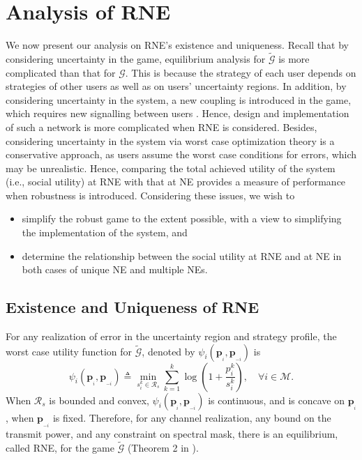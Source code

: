 \documentclass[peerreview,onecolumn,11pt,draftclsnofoot]{IEEEtran}\usepackage{amsmath}\usepackage{amsfonts}\usepackage{epsfig}\usepackage{amssymb}\usepackage{graphicx}\usepackage{amssymb,amsmath}\usepackage{cite}\usepackage{color,soul}\newcommand\T{\rule{0pt}{3.1ex}}
\begin{document}
\section{Analysis of RNE}
We now present our analysis on RNE's existence and uniqueness. Recall that by considering uncertainty in the game, equilibrium analysis for $\widetilde{\mathcal{G}}$ is more complicated than that for $\mathcal{G}$. This is because the strategy of each user depends on strategies of other users as well as on users' uncertainty regions. In addition, by considering uncertainty in the system, a new coupling is introduced in the game, which requires new signalling between users \cite{Robustnew}. Hence, design and implementation of such a network is more complicated when RNE is considered. Besides, considering uncertainty in the system via worst case optimization theory is a conservative approach, as users assume the worst case conditions for errors, which may be unrealistic. Hence, comparing the total achieved utility of the system (i.e., social utility) at RNE with that at NE provides a measure of performance when robustness is introduced. Considering these issues, we wish to
\begin{itemize}
  \item simplify the robust game to the extent possible, with a view to simplifying the implementation of the system, and
  \item determine the relationship between the social utility at RNE and at NE in both cases of unique NE and multiple NEs.
\end{itemize}

\subsection{Existence and Uniqueness of RNE}

For any realization of error in the uncertainty region and strategy profile, the worst case utility function for $\widetilde{\mathcal{G}}$, denoted by $\psi_i(\mathbf{p}_{_{i}},\mathbf{p}_{_{-i}})$ is
\begin{equation}\label{rho}
    \psi_i(\mathbf{p}_{_{i}},\mathbf{p}_{_{-i}})\triangleq \min_{s^{k}_{i}\in \mathcal{R}_{s}
    }\sum_{k=1}^{k}\log(1+\frac{p^{k}_{i}}{s^{k}_{i}}), \quad
    \forall i \in \mathcal{M}.
\end{equation}
When $\mathcal{R}_{s}$ is bounded and convex,
$\psi_i(\mathbf{p}_{_{i}},\mathbf{p}_{_{-i}})$ is continuous, and is concave on $\mathbf{p}_{_{i}}$, when $\mathbf{p}_{_{-i}}$ is fixed. Therefore, for any channel realization, any bound on the transmit power, and any constraint on spectral mask, there is an equilibrium, called RNE, for the game $\widetilde{\mathcal{G}}$ (Theorem 2 in \cite{Robustgame}).
\end{document}
